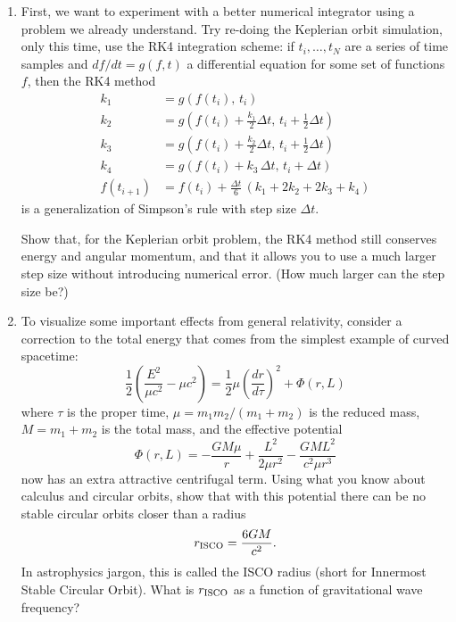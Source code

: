 \documentclass[11pt]{article}
\begin{document}
\begin{enumerate}

\item First, we want to experiment with a better numerical integrator using a problem we already understand. Try re-doing the Keplerian orbit simulation, only this time, use the RK4 integration scheme: if $t_i, \dots, t_N$ are a series of time samples and $df/dt = g(f, t)$ a differential equation for some set of functions $f$, then the RK4 method
\begin{align*}
k_1 &= g(f(t_i), \, t_i) \\
k_2 &= g\left(f(t_i) + \frac{k_1}{2}\Delta t, \, t_i + \frac{1}{2}\Delta t\right) \\
k_3 &= g\left(f(t_i) + \frac{k_2}{2}\Delta t, \, t_i + \frac{1}{2}\Delta t\right) \\
k_4 &= g(f(t_i) + k_3\,\Delta t, \, t_i + \Delta t) \\
f(t_{i+1}) &= f(t_i) + \frac{\Delta t}{6}\,\left(k_1 + 2k_2 + 2k_3 + k_4\right)
\end{align*}
is a generalization of Simpson's rule with step size $\Delta t$.

\hspace{15pt} Show that, for the Keplerian orbit problem, the RK4 method still conserves energy and angular momentum, and that it allows you to use a much larger step size without introducing numerical error. (How much larger can the step size be?)

\item To visualize some important effects from general relativity, consider a correction to the total energy that comes from the simplest example of curved spacetime:
\begin{equation}
\frac{1}{2} \left(\frac{E^2}{\mu c^2} - \mu c^2\right) = \frac{1}{2}\mu\left(\frac{dr}{d\tau}\right)^2 + \Phi(r, L)
\end{equation}
where $\tau$ is the proper time, $\mu = m_1 m_2/(m_1 + m_2)$ is the reduced mass, $M = m_1 + m_2$ is the total mass, and the effective potential
\begin{equation}\label{eq:potential}
\Phi(r, L) = -\frac{GM\mu}{r} + \frac{L^2}{2\mu r^2} - \frac{GML^2}{c^2\mu r^3}
\end{equation}
now has an extra attractive centrifugal term. Using what you know about calculus and circular orbits, show that with this potential there can be no stable circular orbits closer than a radius
\begin{equation}\label{eq:ISCO}
r_{\rm ISCO} = \frac{6GM}{c^2}.
\end{equation}
In astrophysics jargon, this is called the ISCO radius (short for Innermost Stable Circular Orbit). What is $r_{\rm ISCO}$ as a function of gravitational wave frequency?


\end{enumerate}
\end{document}

